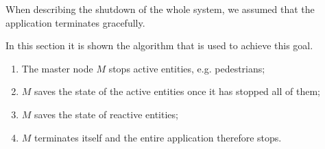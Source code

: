 When describing the shutdown of the whole system, we assumed that the
application terminates gracefully.

In this section it is shown the algorithm that is used to achieve this goal.

\begin{enumerate}
  \item The master node $M$ stops active entities, e.g. pedestrians;
  \item $M$ saves the state of the active entities once it has stopped all of
    them;
  \item $M$ saves the state of reactive entities;
  \item $M$ terminates itself and the entire application therefore stops.
\end{enumerate}

